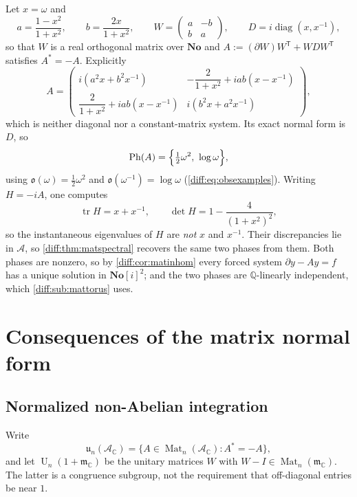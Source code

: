 \documentclass[11pt,letterpaper]{article}
\numberwithin{equation}{section}
\theoremstyle{definition}
\theoremstyle{remark}
\newcommand{\No}{\mathbf{No}}
\newcommand{\SC}{\mathbf{No}[i]}
\newcommand{\C}{\mathbb C}
\newcommand{\Q}{\mathbb Q}
\newcommand{\der}{\partial}
\newcommand{\mm}{\mathfrak m}
\newcommand{\Acl}{\mathcal A}
\newcommand{\Obs}{\mathfrak o}
\newcommand{\Mat}{\operatorname{Mat}}
\newcommand{\tr}{\operatorname{tr}}
\newcommand{\Un}{\operatorname{U}}
\newcommand{\Ph}{\operatorname{Ph}}
\begin{document}
\begin{example}
\label{diff:ex:matcoupled}
Let $x=\omega$ and
\[
 a=\frac{1-x^{2}}{1+x^{2}},
 \qquad b=\frac{2x}{1+x^{2}},
 \qquad
 W=\begin{pmatrix}a&-b\\b&a\end{pmatrix},
 \qquad
 D=i\operatorname{diag}(x,x^{-1}),
\]
so that $W$ is a real orthogonal matrix over $\No$ and
$A:=(\der W)W^{\mathsf T}+WDW^{\mathsf T}$ satisfies $A^{*}=-A$. Explicitly
\[
 A=\begin{pmatrix}
 i(a^{2}x+b^{2}x^{-1}) &
 -\dfrac{2}{1+x^{2}}+iab(x-x^{-1})\\[6pt]
 \dfrac{2}{1+x^{2}}+iab(x-x^{-1}) &
 i(b^{2}x+a^{2}x^{-1})
 \end{pmatrix},
\]
which is neither diagonal nor a constant-matrix system. Its exact normal form
is $D$, so
\[
 \Ph(A)=\Bigl\{\tfrac12\omega^{2},\ \log\omega\Bigr\},
\]
using $\Obs(\omega)=\tfrac12\omega^{2}$ and $\Obs(\omega^{-1})=\log\omega$
(\cref{diff:eq:obsexamples}). Writing $H=-iA$, one computes
\[
 \tr H=x+x^{-1},
 \qquad
 \det H=1-\frac{4}{(1+x^{2})^{2}},
\]
so the instantaneous eigenvalues of $H$ are \emph{not} $x$ and $x^{-1}$. Their
discrepancies lie in $\Acl$, so \cref{diff:thm:matspectral} recovers the same
two phases from them. Both phases are nonzero, so by
\cref{diff:cor:matinhom} every forced system $\der y-Ay=f$ has a unique
solution in $\SC^{2}$; and the two phases are $\Q$-linearly independent, which
\cref{diff:sub:mattorus} uses.
\end{example}

\section{Consequences of the matrix normal form}
\label{diff:sec:matconsequences}

\subsection{Normalized non-Abelian integration}
\label{diff:sub:matnonabelian}

Write
\[
 \mathfrak u_{n}(\Acl_{\C})
  =\{A\in\Mat_{n}(\Acl_{\C}):A^{*}=-A\},
\]
and let $\Un_{n}(1+\mm_{\C})$ be the unitary matrices $W$ with
$W-I\in\Mat_{n}(\mm_{\C})$. The latter is a congruence subgroup, not the
requirement that off-diagonal entries be near $1$.
\end{document}
